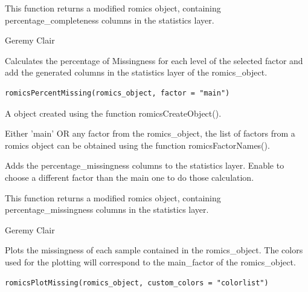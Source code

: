 \documentclass[a4paper]{book}
\begin{document}
%
\begin{Value}
This function returns a modified romics object, containing percentage\_completeness columns in the statistics layer.
\end{Value}
%
\begin{Author}
Geremy Clair
\end{Author}
%
\begin{Description}
Calculates the percentage of Missingness for each level of the selected factor and add the generated columns in the statistics layer of the romics\_object.
\end{Description}
%
\begin{Usage}
\begin{verbatim}
romicsPercentMissing(romics_object, factor = "main")
\end{verbatim}
\end{Usage}
%
\begin{Arguments}
\begin{ldescription}
\item[\code{romics\_object}] A object created using the function romicsCreateObject().

\item[\code{main\_factor}] Either 'main' OR any factor from the romics\_object, the list of factors from a romics object can be obtained using the function romicsFactorNames().
\end{ldescription}
\end{Arguments}
%
\begin{Details}
Adds the percentage\_missingness columns to the statistics layer. Enable to choose a different factor than the main one to do those calculation.
\end{Details}
%
\begin{Value}
This function returns a modified romics object, containing percentage\_missingness columns in the statistics layer.
\end{Value}
%
\begin{Author}
Geremy Clair
\end{Author}
%
\begin{Description}
Plots the missingness of each sample contained in the romics\_object. The colors used for the plotting will correspond to the main\_factor of the romics\_object.
\end{Description}
%
\begin{Usage}
\begin{verbatim}
romicsPlotMissing(romics_object, custom_colors = "colorlist")
\end{verbatim}
\end{Usage}
\end{document}
